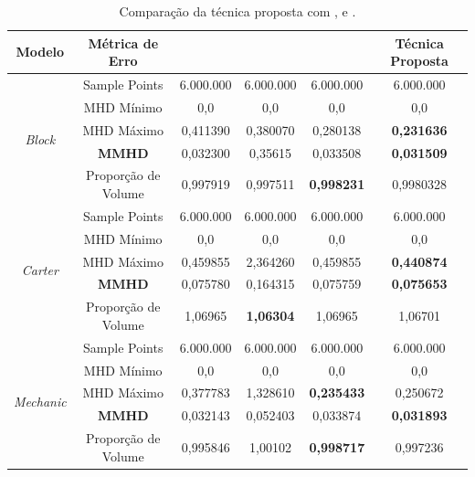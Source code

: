\begin{table}[]
\centering
\footnotesize
\renewcommand{\arraystretch}{1.3}
\caption{Comparação da técnica proposta com \cite{zhang2015guided}, \cite{sun2007fast} e \cite{zheng2011bilateral}.}
\setlength\tabcolsep{2pt}
\begin{tabular}{ |c|c|c|c|c|c| } 
\hline
Modelo & Métrica de Erro & \cite{zhang2015guided} & \cite{sun2007fast} & \cite{zheng2011bilateral} & Técnica Proposta \\
\hline
\hline

\multirow{5}{4em}{\centering \textit{Block}} 
& Sample Points & 6.000.000 & 6.000.000 & 6.000.000 & 6.000.000\\ 
\cline{2-6}
& MHD Mínimo & 0,0 & 0,0 & 0,0 & 0,0\\ 
\cline{2-6}
& MHD Máximo & 0,411390 & 0,380070 & 0,280138 & \textbf{0,231636}\\ 
\cline{2-6}
& \textbf{MMHD} & 0,032300 & 0,35615 & 0,033508 & \textbf{0,031509} \\ 
\cline{2-6}
& Proporção de Volume & 0,997919 & 0,997511 & \textbf{0,998231} & 0,9980328\\ 
\cline{1-6}

\multirow{5}{4em}{\centering \textit{Carter}} 
& Sample Points & 6.000.000 & 6.000.000 & 6.000.000 & 6.000.000\\ 
\cline{2-6}
& MHD Mínimo & 0,0 & 0,0 & 0,0 & 0,0\\ 
\cline{2-6}
& MHD Máximo & 0,459855 & 2,364260 & 0,459855 & \textbf{0,440874}\\ 
\cline{2-6}
& \textbf{MMHD} & 0,075780 & 0,164315 & 0,075759 & \textbf{0,075653} \\ 
\cline{2-6}
& Proporção de Volume & 1,06965 & \textbf{1,06304} & 1,06965 & 1,06701\\ 
\cline{1-6}

\multirow{5}{4em}{\centering \textit{Mechanic}} 
& Sample Points & 6.000.000 & 6.000.000 & 6.000.000 & 6.000.000\\ 
\cline{2-6}
& MHD Mínimo & 0,0 & 0,0 & 0,0 & 0,0\\ 
\cline{2-6}
& MHD Máximo & 0,377783 & 1,328610 & \textbf{0,235433} & 0,250672\\ 
\cline{2-6}
& \textbf{MMHD} & 0,032143 & 0,052403 & 0,033874 & \textbf{0,031893} \\ 
\cline{2-6}
& Proporção de Volume & 0,995846 & 1,00102 & \textbf{0,998717} & 0,997236 \\ 
\cline{1-6}

\hline
\end{tabular}
\label{table:comparação_métricas}
\end{table}
